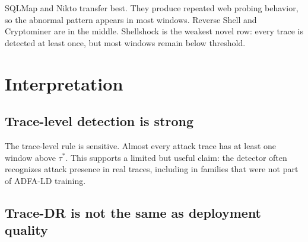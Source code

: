 \documentclass[11pt,a4paper]{article}
\begin{document}
\begin{table}[htbp]
\centering
\caption{Novel family descriptions and expected syscall signals.}
\label{tab:novel-descriptions}
\end{table}

SQLMap and Nikto transfer best. They produce repeated web probing behavior, so the abnormal pattern appears in most windows. Reverse Shell and Cryptominer are in the middle. Shellshock is the weakest novel row: every trace is detected at least once, but most windows remain below threshold.

\section{Interpretation}

\subsection{Trace-level detection is strong}

The trace-level rule is sensitive. Almost every attack trace has at least one window above \(\tau^*\). This supports a limited but useful claim: the detector often recognizes attack presence in real traces, including in families that were not part of ADFA-LD training.

\subsection{Trace-DR is not the same as deployment quality}
\end{document}

